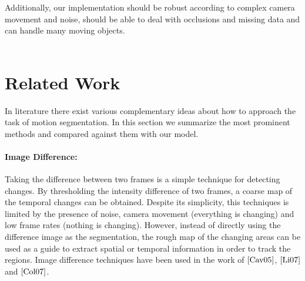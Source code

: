Additionally, our implementation should be robust according to complex camera movement and noise, should be able to deal with occlusions and missing data and can handle many moving objects. \\ \\

\section{Related Work}
In literature there exist various complementary ideas about how to approach the task of motion segmentation. In this section we summarize the most prominent methods  and compared against them with our model.
%
%
%
%

\paragraph{Image Difference:} Taking the difference between two frames is a simple technique for detecting changes. By thresholding the intensity difference of two frames, a coarse map of the temporal changes can be obtained. Despite its simplicity, this techniques is limited by the presence of noise, camera movement (everything is changing) and low frame rates (nothing is changing). However, instead of directly using the difference image as the segmentation, the rough map of the changing areas can be used as a guide to extract spatial or temporal information in order to track the regions. Image difference techniques have been used in the work of $\cite{Cav05}$, $\cite{Li07}$ and $\cite{Col07}$.

